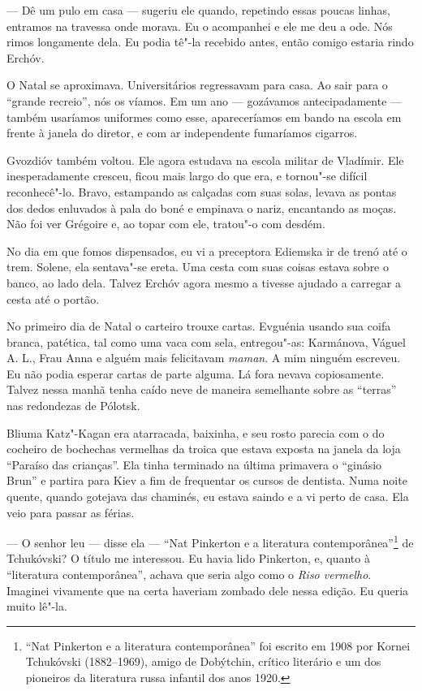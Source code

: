 --- Dê um pulo em casa --- sugeriu ele quando, repetindo essas poucas
linhas, entramos na travessa onde morava. Eu o acompanhei e ele me deu a
ode. Nós rimos longamente dela. Eu podia tê"-la recebido antes, então
comigo estaria rindo Erchóv.

O Natal se aproximava. Universitários regressavam para casa. Ao sair
para o ``grande recreio'', nós os víamos. Em um ano --- gozávamos
antecipadamente --- também usaríamos uniformes como esse, apareceríamos
em bando na escola em frente à janela do diretor, e com ar independente
fumaríamos cigarros.

Gvozdióv também voltou. Ele agora estudava na escola militar de
Vladímir. Ele inesperadamente cresceu, ficou mais largo do que era, e
tornou"-se difícil reconhecê"-lo. Bravo, estampando as calçadas com suas
solas, levava as pontas dos dedos enluvados à pala do boné e empinava o
nariz, encantando as moças. Não foi ver Grégoire e, ao topar com ele,
tratou"-o com desdém.

No dia em que fomos dispensados, eu vi a preceptora Ediemska ir de trenó
até o trem. Solene, ela sentava"-se ereta. Uma cesta com suas coisas
estava sobre o banco, ao lado dela. Talvez Erchóv agora mesmo a tivesse
ajudado a carregar a cesta até o portão.

No primeiro dia de Natal o carteiro trouxe cartas. Evguénia usando sua
coifa branca, patética, tal como uma vaca com sela, entregou"-as:
Karmánova, Váguel A. L., Frau Anna e alguém mais felicitavam
\emph{maman}. A mim ninguém escreveu. Eu não podia esperar cartas de
parte alguma. Lá fora nevava copiosamente. Talvez nessa manhã tenha
caído neve de maneira semelhante sobre as ``terras'' nas redondezas de
Pólotsk.

Bliuma Katz"-Kagan era atarracada, baixinha, e seu rosto parecia com o do
cocheiro de bochechas vermelhas da troica que estava exposta na janela
da loja ``Paraíso das crianças''. Ela tinha terminado na última
primavera o ``ginásio Brun'' e partira para Kiev a fim de frequentar os
cursos de dentista. Numa noite quente, quando gotejava das chaminés, eu
estava saindo e a vi perto de casa. Ela veio para passar as férias.

--- O senhor leu --- disse ela --- ``Nat Pinkerton e a literatura %
contemporânea''\footnote{``Nat Pinkerton e a literatura contemporânea''
  foi escrito em 1908 por Kornei Tchukóvski (1882--1969), amigo de
  Dobýtchin, crítico literário e um dos pioneiros da literatura russa
  infantil dos anos 1920.} de Tchukóvski? O título me interessou. Eu
havia lido Pinkerton, e, quanto à ``literatura contemporânea'', achava
que seria algo como o \emph{Riso vermelho}. Imaginei vivamente que na
certa haveriam zombado dele nessa edição. Eu queria muito lê"-la.

